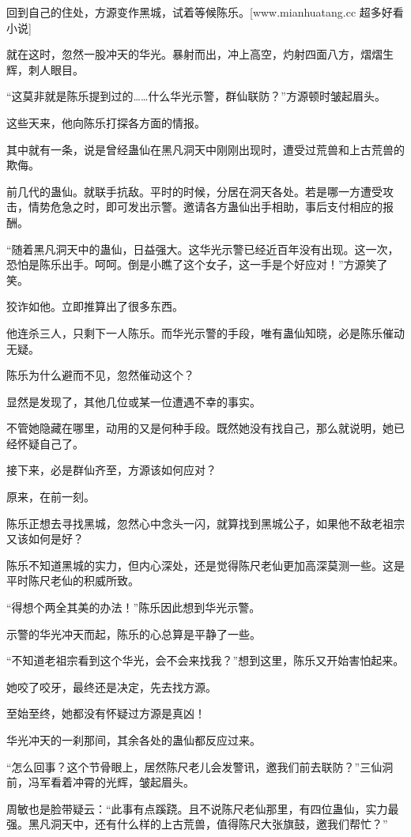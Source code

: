 \begin{this_body}
回到自己的住处，方源变作黑城，试着等候陈乐。[www.mianhuatang.cc 超多好看小说]

就在这时，忽然一股冲天的华光。暴射而出，冲上高空，灼射四面八方，熠熠生辉，刺人眼目。

“这莫非就是陈乐提到过的……什么华光示警，群仙联防？”方源顿时皱起眉头。

这些天来，他向陈乐打探各方面的情报。

其中就有一条，说是曾经蛊仙在黑凡洞天中刚刚出现时，遭受过荒兽和上古荒兽的欺侮。

前几代的蛊仙。就联手抗敌。平时的时候，分居在洞天各处。若是哪一方遭受攻击，情势危急之时，即可发出示警。邀请各方蛊仙出手相助，事后支付相应的报酬。

“随着黑凡洞天中的蛊仙，日益强大。这华光示警已经近百年没有出现。这一次，恐怕是陈乐出手。呵呵。倒是小瞧了这个女子，这一手是个好应对！”方源笑了笑。

狡诈如他。立即推算出了很多东西。

他连杀三人，只剩下一人陈乐。而华光示警的手段，唯有蛊仙知晓，必是陈乐催动无疑。

陈乐为什么避而不见，忽然催动这个？

显然是发现了，其他几位或某一位遭遇不幸的事实。

不管她隐藏在哪里，动用的又是何种手段。既然她没有找自己，那么就说明，她已经怀疑自己了。

接下来，必是群仙齐至，方源该如何应对？

原来，在前一刻。

陈乐正想去寻找黑城，忽然心中念头一闪，就算找到黑城公子，如果他不敌老祖宗又该如何是好？

陈乐不知道黑城的实力，但内心深处，还是觉得陈尺老仙更加高深莫测一些。这是平时陈尺老仙的积威所致。

“得想个两全其美的办法！”陈乐因此想到华光示警。

示警的华光冲天而起，陈乐的心总算是平静了一些。

“不知道老祖宗看到这个华光，会不会来找我？”想到这里，陈乐又开始害怕起来。

她咬了咬牙，最终还是决定，先去找方源。

至始至终，她都没有怀疑过方源是真凶！

华光冲天的一刹那间，其余各处的蛊仙都反应过来。

“怎么回事？这个节骨眼上，居然陈尺老儿会发警讯，邀我们前去联防？”三仙洞前，冯军看着冲霄的光辉，皱起眉头。

周敏也是脸带疑云：“此事有点蹊跷。且不说陈尺老仙那里，有四位蛊仙，实力最强。黑凡洞天中，还有什么样的上古荒兽，值得陈尺大张旗鼓，邀我们帮忙？”


\end{this_body}
